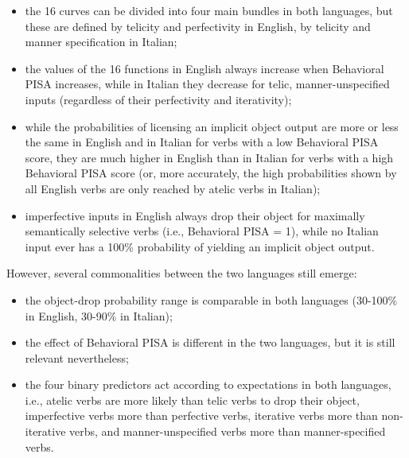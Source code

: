 \begin{itemize}
    \item the 16 curves can be divided into four main bundles in both languages, but these are defined by telicity and perfectivity in English, by telicity and manner specification in Italian;
    \item the values of the 16 functions in English always increase when Behavioral PISA increases, while in Italian they decrease for telic, manner-unspecified inputs (regardless of their perfectivity and iterativity);
    \item while the probabilities of licensing an implicit object output are more or less the same in English and in Italian for verbs with a low Behavioral PISA score, they are much higher in English than in Italian for verbs with a high Behavioral PISA score (or, more accurately, the high probabilities shown by all English verbs are only reached by atelic verbs in Italian);
    \item imperfective inputs in English always drop their object for maximally semantically selective verbs (i.e., Behavioral PISA = 1), while no Italian input ever has a 100\% probability of yielding an implicit object output.
\end{itemize}

However, several commonalities between the two languages still emerge:
\begin{itemize}
    \item the object-drop probability range is comparable in both languages (30-100\% in English, 30-90\% in Italian);
    \item the effect of Behavioral PISA is different in the two languages, but it is still relevant nevertheless;
    \item the four binary predictors act according to expectations in both languages, i.e., atelic verbs are more likely than telic verbs to drop their object, imperfective verbs more than perfective verbs, iterative verbs more than non-iterative verbs, and manner-unspecified verbs more than manner-specified verbs.
\end{itemize}

